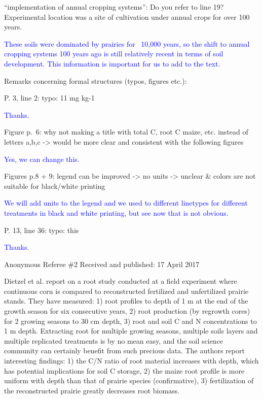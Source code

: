 \documentclass[]{article}
\begin{document}
``implementation of annual cropping systems'': Do you refer to line 19?
Experimental location was a site of cultivation under annual crops for
over 100 years.

\textcolor{blue}{These soils were dominated by prairies for ~10,000 years, so the shift to annual cropping systems 100 years ago is still relatively recent in terms of soil development. This information is important for us to add to the text.}

Remarks concerning formal structures (typos, figures etc.):

P. 3, line 2: typo: 11 mg kg-1

\textcolor{blue}{Thanks.}

Figure p.~6: why not making a title with total C, root C maize, etc.
instead of letters a,b,c -\textgreater{} would be more clear and
consistent with the following figures

\textcolor{blue}{Yes, we can change this.}

Figures p.8 + 9: legend can be improved -\textgreater{} no units
-\textgreater{} unclear \& colors are not suitable for black/white
printing

\textcolor{blue}{We will add units to the legend and we used to different linetypes for different treatments in black and white printing, but see now that is not obvious.}

P. 13, line 36: typo: this

\textcolor{blue}{Thanks.}

Anonymous Referee \#2 Received and published: 17 April 2017

Dietzel et al. report on a root study conducted at a field experiment
where continuous corn is compared to reconstructed fertilized and
unfertilized prairie stands. They have measured: 1) root profiles to
depth of 1 m at the end of the growth season for six consecutive years,
2) root production (by regrowth cores) for 2 growing seasons to 30 cm
depth, 3) root and soil C and N concentrations to 1 m depth. Extracting
root for multiple growing seasons, multiple soils layers and multiple
replicated treatments is by no mean easy, and the soil science community
can certainly benefit from such precious data. The authors report
interesting findings: 1) the C/N ratio of root material increases with
depth, which has potential implications for soil C storage, 2) the maize
root profile is more uniform with depth than that of prairie species
(confirmative), 3) fertilization of the reconstructed prairie greatly
decreases root biomass.
\end{document}
